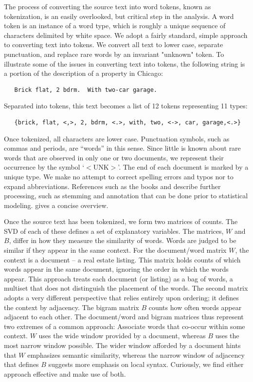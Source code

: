 \documentclass[12pt]{article}
\begin{document}
 The process of converting the source text into word tokens, known as
 tokenization, is an easily overlooked, but critical step in the analysis.  A
 word token is an instance of a word type, which is roughly a unique sequence of characters delimited by white space.  We adopt a fairly standard, simple approach to converting text into tokens.  We convert all text to lower case, separate punctuation, and replace rare words by an invariant "unknown" token.   To illustrate some of the issues in converting text into tokens, the following string is a portion of the description of a property in Chicago:
 \begin{verbatim}
   Brick flat, 2 bdrm.  With two-car garage. \end{verbatim} 
 \noindent
 Separated into tokens, this text becomes a list of 12 tokens representing 11
 types:
 \begin{verbatim}
   {brick, flat, <,>, 2, bdrm, <.>, with, two, <->, car, garage,<.>} \end{verbatim} 
 \noindent
 Once tokenized, all characters are lower case.  Punctuation
 symbols, such as commas and periods, are ``words'' in this sense.  Since little
 is known about rare words that are observed in only one or two documents, we
 represent their occurrence by the symbol `$<$UNK$>$'.  The end of each document is marked by a unique type.  We make no attempt to correct spelling errors and typos nor to expand abbreviations. References such as the books \citet{manning99} and \citet{jurafsky09} describe further processing, such as stemming and annotation that can be done prior to statistical modeling. \citet{turney10} gives a concise overview.
 

Once the source text has been tokenized, we form two matrices of counts.  The SVD of each of these defines a set of explanatory variables.  The matrices, $W$ and $B$,  differ in how they measure the similarity of words. Words are judged to be similar if they appear in the same context.  For the document/word matrix $W$, the context is a document -- a real estate listing.  This matrix holds counts of which words appear in the same document, ignoring the order in which the words appear. This approach treats each document (or listing) as a bag of words, a multiset that does not distinguish the placement of the words.  The second matrix adopts a very different perspective that relies entirely upon ordering; it defines the context by adjacency.  The bigram matrix $B$ counts how often words  appear adjacent to each other.  The document/word and bigram matrices thus represent two extremes of a common approach:  Associate words that co-occur within some context.  $W$ uses the wide window provided by a document, whereas $B$ uses the most narrow window possible. The wider window afforded by a document hints that $W$ emphasizes semantic similarity, whereas the narrow window of adjacency that defines $B$ suggests more emphasis on local syntax.  Curiously, we find either approach effective and make use of both.
 
\end{document}
